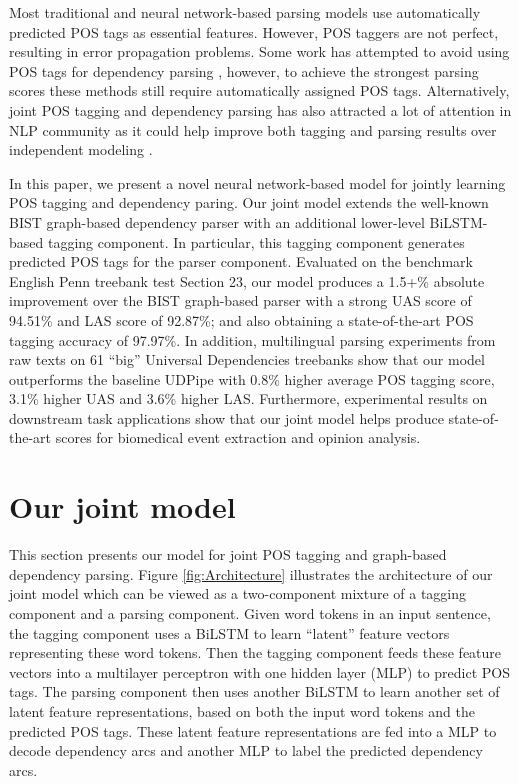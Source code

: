 \documentclass[11pt,letterpaper]{article}
\begin{document}
 Most traditional and neural network-based parsing models use automatically predicted POS  tags as essential features. However, POS taggers are not perfect,  resulting in error propagation problems. Some work has attempted to avoid using POS tags for dependency parsing \citep{dyer-EtAl:2015:ACL-IJCNLP,ballesterosEMNLP,K17-3022}, however,   to achieve the strongest parsing scores these methods still require automatically assigned POS tags. Alternatively, joint POS tagging and dependency parsing has also attracted a lot of  attention in  NLP community as it could help improve  both tagging and parsing results over independent modeling  \citep{Li:2011:JMC:2145432.2145557,hatori-EtAl:2011:IJCNLP-2011,Lee:2011:DMJ:2002472.2002584,bohnet-nivre:2012:EMNLP-CoNLL,zhang-EtAl:2015:NAACL-HLT1,zhang-weiss:2016:P16-1,YangZLSYF18}.

In this paper, we present a novel  neural network-based model for jointly learning POS tagging and dependency paring. Our joint model extends the well-known BIST graph-based dependency parser \citep{TACL885}  with an additional lower-level BiLSTM-based tagging component. In particular, this tagging component generates predicted POS tags for the parser component.  Evaluated on the benchmark English Penn treebank test Section 23, our model produces a 1.5+\%  absolute improvement over the  BIST graph-based  parser with a  strong UAS score of 94.51\%  and LAS score of 92.87\%; and also obtaining a state-of-the-art POS tagging accuracy of 97.97\%. In addition,  multilingual parsing  experiments from raw texts on   61 ``big'' Universal Dependencies treebanks   \citep{udst:overview} 
 show that our model outperforms the baseline UDPipe \citep{udpipe:2017}   with 0.8\% higher average POS tagging score, 3.1\% higher UAS and  3.6\% higher LAS. Furthermore, experimental results on downstream task applications \citep{epe18} show that our joint model helps produce state-of-the-art scores for biomedical event extraction and opinion analysis. 

\section{Our joint model}

This section presents our  model for joint POS tagging and graph-based dependency parsing. Figure \ref{fig:Architecture} illustrates the architecture of our joint model which can be viewed as a two-component mixture of a tagging component and a parsing component. Given word tokens in an input sentence, the tagging component uses a BiLSTM to learn ``latent'' feature vectors representing these word tokens. Then the tagging component feeds these feature vectors into a multilayer perceptron with one hidden layer (MLP)  to predict POS tags.  The parsing component then uses another BiLSTM to learn another set of latent feature representations, based on both the input word tokens and the predicted POS tags.  These  latent feature representations are   fed into a MLP to decode  dependency arcs and another MLP to label the predicted dependency arcs. 
 
\end{document}
